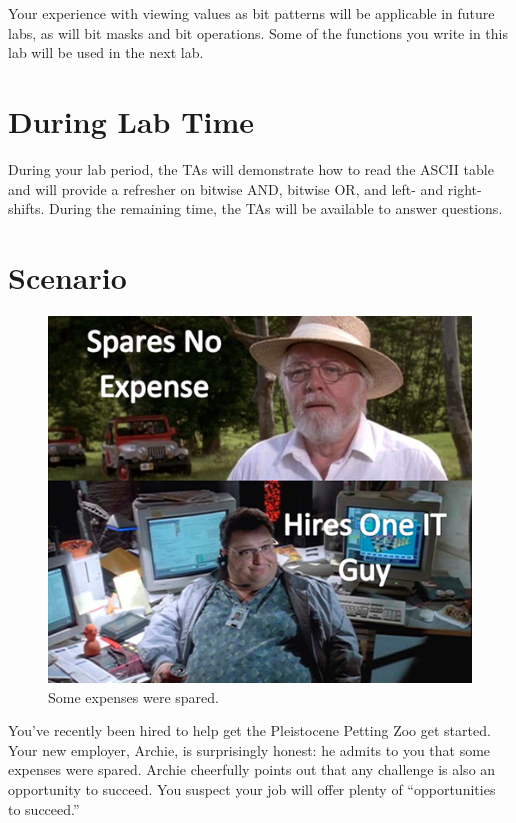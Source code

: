 Your experience with viewing values as bit patterns will be applicable in
future labs, as will bit masks and bit operations. Some of the functions you
write in this lab will be used in the next lab.

\section*{During Lab Time}

During your lab period, the TAs will demonstrate how to read the ASCII table and
will provide a refresher on bitwise AND, bitwise OR, and left- and right-shifts.
During the remaining time, the TAs will be available to answer questions.

\softwareengineeringfrontmatter

\section*{Scenario}

\begin{figure}
    \centering
    \includegraphics[scale=.33]{some-expenses-spared}
    \caption{Some expenses were spared.}
\end{figure}

You've recently been hired to help get the Pleistocene Petting Zoo get started.
Your new employer, Archie, is surprisingly honest: he admits to you that some
expenses were spared. Archie cheerfully points out that any challenge is also
an opportunity to succeed. You suspect your job will offer plenty of
``opportunities to succeed.''


